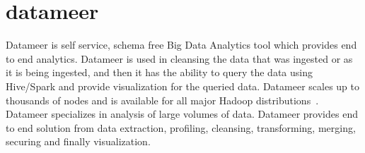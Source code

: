 \section{datameer}
Datameer is self service, schema free Big Data Analytics tool which provides end to end analytics. Datameer is used in cleansing the data that was ingested or as it is being ingested, and then it has the ability to query the data using Hive/Spark and provide visualization for the queried data. Datameer scales up to thousands of nodes and is available for all major Hadoop distributions~\cite{datameer}. Datameer specializes in analysis of large volumes of data. Datameer provides end to end solution from data extraction, profiling, cleansing, transforming, merging, securing and finally visualization.

